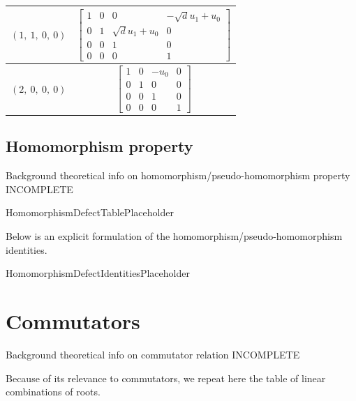 \documentclass[11pt]{article}
\newcommand{\noi}{\noindent}
\theoremstyle{definition}
\begin{document}
\begin{tabular}{|l|c|}
    \hline
    $\left( 1, \  1, \  0, \  0\right)$ & $\left[\begin{matrix}1 & 0 & 0 & - \sqrt{d} u_{1} + u_{0}\\0 & 1 & \sqrt{d} u_{1} + u_{0} & 0\\0 & 0 & 1 & 0\\0 & 0 & 0 & 1\end{matrix}\right]$ \\
    \hline
    $\left( 2, \  0, \  0, \  0\right)$ & $\left[\begin{matrix}1 & 0 & - u_{0} & 0\\0 & 1 & 0 & 0\\0 & 0 & 1 & 0\\0 & 0 & 0 & 1\end{matrix}\right]$ \\
    \hline
\end{tabular}


\subsection{Homomorphism property}

\noi Background theoretical info on homomorphism/pseudo-homomorphism property INCOMPLETE

\bigskip

HomomorphismDefectTablePlaceholder

\noi Below is an explicit formulation of the homomorphism/pseudo-homomorphism identities.

\bigskip

HomomorphismDefectIdentitiesPlaceholder

\newpage
\section{Commutators}

\noi Background theoretical info on commutator relation INCOMPLETE

\noi Because of its relevance to commutators, we repeat here the table of linear combinations of roots.
\end{document}

